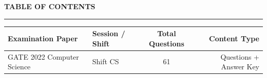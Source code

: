 \documentclass[a4paper,10pt,twoside]{article}
\begin{document}
\newpage

\begin{center}
    {\Large\textbf{TABLE OF CONTENTS}}\\[0.4em]
    \rule{0.5\textwidth}{0.6pt}
\end{center}
\vspace{1em}

\noindent\begin{tabularx}{\linewidth}{|X|l|c|r|}
\hline
\textbf{Examination Paper} & \textbf{Session / Shift} & \textbf{Total Questions} & \textbf{Content Type} \\
\hline

GATE 2022 Computer Science & Shift CS & 61 & Questions + Answer Key \\ \hline
\end{tabularx}

\vspace{1.5em}

\newpage
\end{document}
